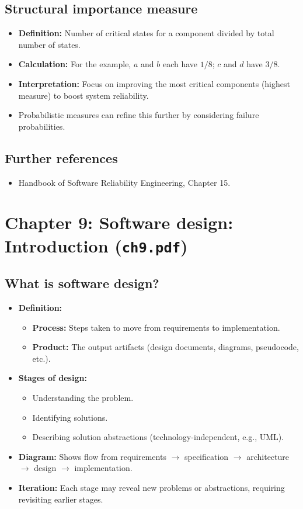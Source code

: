 \documentclass[11pt,a4paper]{article}
\begin{document}
\subsection*{Structural importance measure}
\begin{itemize}
    \item \textbf{Definition:} Number of critical states for a component divided by total number of states.
    \item \textbf{Calculation:} For the example, $a$ and $b$ each have $1/8$; $c$ and $d$ have $3/8$.
    \item \textbf{Interpretation:} Focus on improving the most critical components (highest measure) to boost system reliability.
    \item Probabilistic measures can refine this further by considering failure probabilities.
\end{itemize}

\subsection*{Further references}
\begin{itemize}
    \item Handbook of Software Reliability Engineering, Chapter 15.
\end{itemize}

\section{Chapter 9: Software design: Introduction (\texttt{ch9.pdf})}

\subsection*{What is software design?}
\begin{itemize}
    \item \textbf{Definition:} 
        \begin{itemize}
            \item \textbf{Process:} Steps taken to move from requirements to implementation.
            \item \textbf{Product:} The output artifacts (design documents, diagrams, pseudocode, etc.).
        \end{itemize}
    \item \textbf{Stages of design:}
        \begin{itemize}
            \item Understanding the problem.
            \item Identifying solutions.
            \item Describing solution abstractions (technology-independent, e.g., UML).
        \end{itemize}
    \item \textbf{Diagram:} Shows flow from requirements $\to$ specification $\to$ architecture $\to$ design $\to$ implementation.
    \item \textbf{Iteration:} Each stage may reveal new problems or abstractions, requiring revisiting earlier stages.
\end{itemize}
\end{document}
